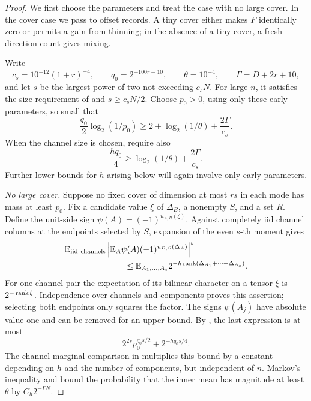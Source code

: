 \begin{proof}
We first choose the parameters and treat the case with no large cover.
In the cover case we pass to offset records. A tiny cover either makes
\(F\) identically zero or permits a gain from thinning; in the absence
of a tiny cover, a fresh-direction count gives mixing.

Write
\[
 c_s=10^{-12}(1+r)^{-4},\qquad q_0=2^{-100r-10},
 \qquad \theta=10^{-4},\qquad \Gamma=D+2r+10,
\]
and let \(s\) be the largest power of two not exceeding \(c_sN\).
For large \(n\), it satisfies the size requirement of
 and \(s\ge c_sN/2\).
Choose \(p_0>0\), using only these early parameters, so small that
\begin{equation}
 \frac{q_0}{2}\log_2(1/p_0)
 \ge 2+\log_2(1/\theta)+\frac{2\Gamma}{c_s}.
 \label{eq:early-p0}
\end{equation}
When the channel size is chosen, require also
\begin{equation}
 \frac{hq_0}{4}
 \ge \log_2(1/\theta)+\frac{2\Gamma}{c_s}.
 \label{eq:early-h-moment}
\end{equation}
Further lower bounds for \(h\) arising below will again involve
only early parameters.

\medskip\noindent
\emph{No large cover.}
Suppose no fixed cover of dimension at most \(rs\) in each mode
has mass at least \(p_0\).  Fix a candidate value \(\xi\) of
\(\Delta_B\), a nonempty \(S\), and a set \(R\).  Define the
unit-side sign \(\psi(A)=(-1)^{u_{A,R}(\xi)}\).  Against completely
iid channel columns at the endpoints selected by \(S\), expansion
of the even \(s\)-th moment gives
\begin{align}
 &\E_{\mathrm{iid\ channels}}
 \left|\E_A\psi(A)(-1)^{u_{B,S}(\Delta_A)}\right|^s
 \notag\\
 &\hspace{25mm}\le
 \E_{A_1,\ldots,A_s}
       2^{-h\rank(\Delta_{A_1}+\cdots+\Delta_{A_s})}.
 \label{eq:phase-moment}
\end{align}
For one channel pair the expectation of its bilinear character
on a tensor \(\xi\) is \(2^{-\operatorname{rank}\xi}\).  Independence over
channels and components proves this assertion; selecting both
endpoints only squares the factor.  The signs \(\psi(A_j)\)
have absolute value one and can be removed for an upper bound.
By , the last expression is at most
\[
 2^{2s}p_0^{q_0s/2}+2^{-hq_0s/4}.
\]
The channel marginal comparison in 
multiplies this bound by a constant depending on \(h\) and the
number of components, but independent of \(n\).
Markov's inequality and
 bound the probability that
the inner mean has magnitude at least \(\theta\) by
\(C_h2^{-\Gamma N}\).


\end{proof}
